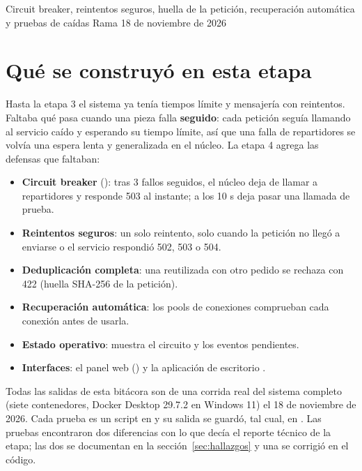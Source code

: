 \documentclass[11pt]{article}
\begin{document}
%
  {Circuit breaker, reintentos seguros, huella de la petición, recuperación automática y pruebas de caídas}%
  {Rama }{18 de noviembre de 2026}

\tableofcontents
\newpage

\section{Qué se construyó en esta etapa}

Hasta la etapa 3 el sistema ya tenía tiempos límite y mensajería con reintentos. Faltaba qué pasa
cuando una pieza falla \textbf{seguido}: cada petición seguía llamando al servicio caído y esperando su
tiempo límite, así que una falla de repartidores se volvía una espera lenta y generalizada en el núcleo.
La etapa 4 agrega las defensas que faltaban:

\begin{itemize}
  \item \textbf{Circuit breaker} (): tras 3 fallos seguidos, el núcleo deja de
        llamar a repartidores y responde 503 al instante; a los 10 s deja pasar una llamada de prueba.
  \item \textbf{Reintentos seguros}: un solo reintento, solo cuando la petición no llegó a enviarse o el
        servicio respondió 502, 503 o 504.
  \item \textbf{Deduplicación completa}: una  reutilizada con otro pedido se rechaza
        con 422 (huella SHA-256 de la petición).
  \item \textbf{Recuperación automática}: los pools de conexiones comprueban cada conexión antes de usarla.
  \item \textbf{Estado operativo}:  muestra el circuito y los eventos pendientes.
  \item \textbf{Interfaces}: el panel web () y la aplicación de escritorio
        .
\end{itemize}

\begin{nota}
Todas las salidas de esta bitácora son de una corrida real del sistema completo (siete contenedores,
Docker Desktop 29.7.2 en Windows 11) el 18 de noviembre de 2026. Cada prueba es un script en
 y su salida se guardó, tal cual, en
. Las pruebas encontraron dos diferencias con lo que decía el reporte técnico
de la etapa; las dos se documentan en la sección~\ref{sec:hallazgos} y una se corrigió en el código.
\end{nota}
\end{document}
